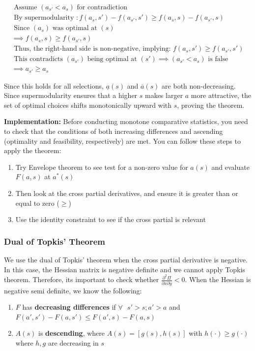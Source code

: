 \documentclass{article}
\begin{document}
\begin{align}
    \text{ Assume } ( a_{s'} < a_s ) \text{ for contradiction } \\
    \text{ By supermodularity }: f(a_s, s') - f(a_{s'}, s') \geq f(a_s, s) - f(a_{s'}, s) \\
    \text{ Since } ( a_s ) \text{ was optimal at } ( s) \\ \implies f(a_s, s) \geq f(a_{s'}, s) \\
    \text{ Thus, the right-hand side is non-negative, implying: } f(a_s, s') \geq f(a_{s'}, s') 
    \\
    \text{ This contradicts } ( a_{s'} ) \text{ being optimal at } ( s' ) \implies ( a_{s'} < a_s )\text{ is false } \\
    \implies  a_{s'} \geq a_s 
\end{align}

Since this holds for all selections, \( \underline{a}(s) \) and \( \overline{a}(s) \) are both non-decreasing. Since supermodularity ensures that a higher \( s \) makes larger \( a \) more attractive, the set of optimal choices shifts monotonically upward with \( s \), proving the theorem.

\vspace{.2cm}
\noindent \textbf{Implementation:} Before conducting monotone comparative statistics, you need to check that the conditions of both increasing differences and ascending (optimality and feasibility, respectively) are met. You can follow these steps to apply the theorem:
    \begin{enumerate}
        \item Try Envelope theorem to see test for a non-zero value for $a(s)$ and evaluate $F(a,s)$ at $a^*(s)$
        \item Then look at the cross partial derivatives, and ensure it is greater than or equal to zero ($\geq$)
        \item Use the identity constraint to see if the cross partial is relevant 
    \end{enumerate}


\subsubsection{Dual of Topkis' Theorem}
We use the dual of Topkis' theorem when the cross partial derivative is negative. In this case, the Hessian matrix is negative definite and we cannot apply Topkis theorem. Therefore, its important to check whether $\frac{\partial ^2 \Pi}{\partial x \partial y} < 0$. When the Hessian is negative semi definite, we know the following: 
\begin{enumerate}
    \item $F$ has \textbf{decreasing differences} if $\forall \text{  } s' > s; a' > a$ and $F(a',s') - F(a,s') \leq F(a',s) - F(a,s)$ 
    \item $A(s)$ is \textbf{descending}, where $A(s) = [g(s), h(s)]$ with $h(\cdot) \geq g(\cdot)$ where $h, g$ are decreasing in $s$
\end{enumerate}
\end{document}
